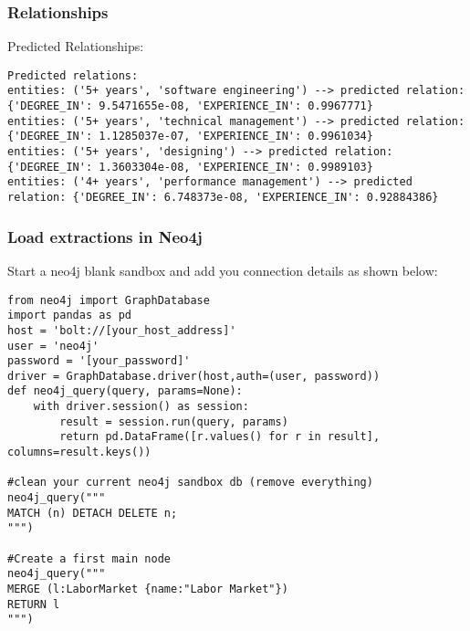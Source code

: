 \begin{frame}[fragile]\frametitle{Relationships}

Predicted Relationships:

\begin{lstlisting}
Predicted relations:  
entities: ('5+ years', 'software engineering') --> predicted relation: {'DEGREE_IN': 9.5471655e-08, 'EXPERIENCE_IN': 0.9967771}  
entities: ('5+ years', 'technical management') --> predicted relation: {'DEGREE_IN': 1.1285037e-07, 'EXPERIENCE_IN': 0.9961034}  
entities: ('5+ years', 'designing') --> predicted relation: {'DEGREE_IN': 1.3603304e-08, 'EXPERIENCE_IN': 0.9989103}  
entities: ('4+ years', 'performance management') --> predicted relation: {'DEGREE_IN': 6.748373e-08, 'EXPERIENCE_IN': 0.92884386}
\end{lstlisting}
	 
\end{frame}


\begin{frame}[fragile]\frametitle{Load extractions in Neo4j}

Start a neo4j blank sandbox and add you connection details as shown below:
 
\begin{lstlisting}
from neo4j import GraphDatabase
import pandas as pd
host = 'bolt://[your_host_address]'
user = 'neo4j'
password = '[your_password]'
driver = GraphDatabase.driver(host,auth=(user, password))
def neo4j_query(query, params=None):
    with driver.session() as session:
        result = session.run(query, params)
        return pd.DataFrame([r.values() for r in result], columns=result.keys())
      
#clean your current neo4j sandbox db (remove everything)
neo4j_query("""
MATCH (n) DETACH DELETE n;
""")

#Create a first main node
neo4j_query("""
MERGE (l:LaborMarket {name:"Labor Market"}) 
RETURN l
""")			
\end{lstlisting}
	 
\end{frame}

